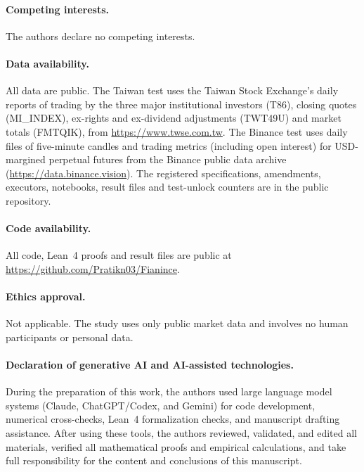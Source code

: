 \documentclass[12pt]{article}
\theoremstyle{definition}
\theoremstyle{remark}
\begin{document}
\paragraph{Competing interests.} The authors declare no competing interests.

\paragraph{Data availability.} All data are public. The Taiwan test uses the Taiwan Stock Exchange's daily reports of trading by the three major institutional investors (T86), closing quotes (MI\_INDEX), ex-rights and ex-dividend adjustments (TWT49U) and market totals (FMTQIK), from \url{https://www.twse.com.tw}. The Binance test uses daily files of five-minute candles and trading metrics (including open interest) for USD-margined perpetual futures from the Binance public data archive (\url{https://data.binance.vision}). The registered specifications, amendments, executors, notebooks, result files and test-unlock counters are in the public repository.

\paragraph{Code availability.} All code, Lean~4 proofs and result files are public at \url{https://github.com/Pratikn03/Fianince}.

\paragraph{Ethics approval.} Not applicable. The study uses only public market data and involves no human participants or personal data.

\paragraph{Declaration of generative AI and AI-assisted technologies.} During the preparation of this work, the authors used large language model systems (Claude, ChatGPT/Codex, and Gemini) for code development, numerical cross-checks, Lean~4 formalization checks, and manuscript drafting assistance. After using these tools, the authors reviewed, validated, and edited all materials, verified all mathematical proofs and empirical calculations, and take full responsibility for the content and conclusions of this manuscript.
\end{document}
